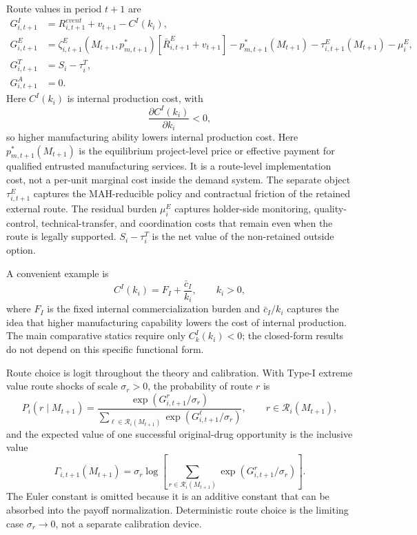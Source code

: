\documentclass[12pt]{article}
\newcommand{\1}{\mathbf{1}}
\newcommand{\calR}{\mathcal{R}}
\begin{document}
Route values in period $t+1$ are
\begin{align}
    G^I_{i,t+1} &= R^{event}_{i,t+1}+v_{t+1}-C^I(k_i),\label{eq:GI}\\
    G^E_{i,t+1} &=
    \zeta^E_{i,t+1}(M_{t+1},p^*_{m,t+1})
    \left[\bar R^E_{i,t+1}+v_{t+1}\right]
    -p^*_{m,t+1}(M_{t+1})
    -\tau^E_{i,t+1}(M_{t+1})
    -\mu_i^E,\label{eq:GE}\\
    G^T_{i,t+1} &= S_i-\tau_i^T,\label{eq:GT}\\
    G^A_{i,t+1} &=0.\label{eq:GA}
\end{align}
Here $C^I(k_i)$ is internal production cost, with
\begin{equation}
    \frac{\partial C^I(k_i)}{\partial k_i}<0,
    \label{eq:CIderiv}
\end{equation}
so higher manufacturing ability lowers internal production cost. Here $p^*_{m,t+1}(M_{t+1})$ is the equilibrium project-level price or effective payment for qualified entrusted manufacturing services. It is a route-level implementation cost, not a per-unit marginal cost inside the demand system. The separate object $\tau^E_{i,t+1}$ captures the MAH-reducible policy and contractual friction of the retained external route. The residual burden $\mu_i^E$ captures holder-side monitoring, quality-control, technical-transfer, and coordination costs that remain even when the route is legally supported. $S_i-\tau_i^T$ is the net value of the non-retained outside option.

A convenient example is
\begin{equation}
    C^I(k_i)=F_I+\frac{\bar c_I}{k_i},
    \qquad k_i>0,
    \label{eq:CI_example}
\end{equation}
where $F_I$ is the fixed internal commercialization burden and $\bar c_I/k_i$ captures the idea that higher manufacturing capability lowers the cost of internal production. The main comparative statics require only $C_k^I(k_i)<0$; the closed-form results do not depend on this specific functional form.

Route choice is logit throughout the theory and calibration. With Type-I extreme value route shocks of scale $\sigma_r>0$, the probability of route $r$ is
\begin{equation}
    P_i(r\mid M_{t+1})
    =
    \frac{\exp(G^r_{i,t+1}/\sigma_r)}
    {\sum_{\ell\in\calR_i(M_{t+1})}\exp(G^\ell_{i,t+1}/\sigma_r)},
    \qquad r\in\calR_i(M_{t+1}),
    \label{eq:logit_prob}
\end{equation}
and the expected value of one successful original-drug opportunity is the inclusive value
\begin{equation}
    \Gamma_{i,t+1}(M_{t+1})
    =
    \sigma_r
    \log
    \left[
    \sum_{r\in\calR_i(M_{t+1})}
    \exp(G^r_{i,t+1}/\sigma_r)
    \right].
    \label{eq:Gamma_general}
\end{equation}
The Euler constant is omitted because it is an additive constant that can be absorbed into the payoff normalization. Deterministic route choice is the limiting case $\sigma_r\to0$, not a separate calibration device.
\end{document}
